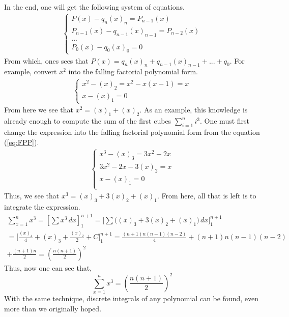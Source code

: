 \documentclass{article}
\begin{document}
In the end, one will get the following system of equations.
\begin{gather*}
\begin{cases}
	P(x) - q_n (x)_n = P_{n - 1}(x) \\
	P_{n - 1}(x) - q_{n - 1} (x)_{n - 1} = P_{n - 2}(x) \\
	... \\
	P_0(x) - q_0 (x)_0 = 0
\end{cases}
\end{gather*}
From which, ones sees that \(P(x) = q_n (x)_n + q_{n - 1} (x)_{n - 1} + ... + q_0\). For example, convert \(x^2\) into the falling factorial polynomial form.
\begin{gather*}
\begin{cases}
	x^2 - (x)_2 = x^2 - x(x - 1) = x \\
	x - (x)_1 = 0
\end{cases}
\end{gather*}
From here we see that \(x^2 = (x)_1 + (x)_2\). As an example, this knowledge is already enough to compute the sum of the first cubes \(\sum_{i = 1}^n i^3\). One must first change the expression into the falling factorial polynomial form from the equation (\ref{eq:FPP}).
\begin{gather*}
\begin{cases}
	x^3 - (x)_3 = 3x^2 - 2x \\
	3x^2 - 2x - 3(x)_2 = x \\
	x - (x)_1 = 0 \\
\end{cases}
\end{gather*}
Thus, we see that \(x^3 = (x)_3 + 3(x)_2 + (x)_1\). From here, all that is left is to integrate the expression.
\begin{multline}
	\sum_{x = 1}^n x^3 = \left[ \sum x^3 \,dx \right]^{n + 1}_1 = \biggl[ \sum \bigl( (x)_3 + 3(x)_2 + (x)_1 \bigr) \,dx \biggr]^{n + 1}_1 \\
	= \biggl[ \frac{(x)_4}{4} + (x)_3 + \frac{(x)_2}{2} + C \biggr]^{n + 1}_1 = \frac{(n + 1)n(n - 1)(n - 2)}{4} + (n + 1)n(n - 1)(n  - 2) \\
	 + \frac{(n + 1)n}{2} = \left( \frac{n(n + 1)}{2} \right)^2
\end{multline}
Thus, now one can see that,
\begin{equation}
	\sum_{x = 1}^n x^3 = \left( \frac{n(n + 1)}{2} \right)^2
\end{equation}
With the same technique, discrete integrals of any polynomial can be found, even more than we originally hoped.
\end{document}
